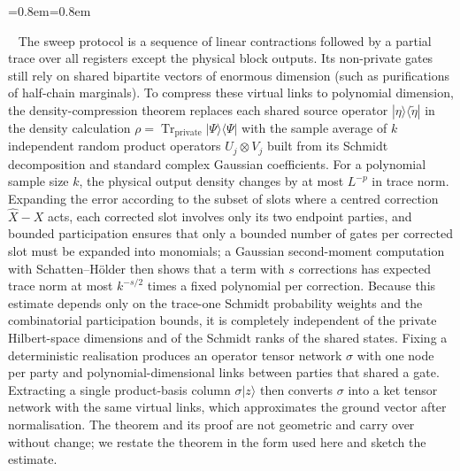 \documentclass[aps,prx,reprint,superscriptaddress,floatfix,nofootinbib,longbibliography,amsmath,amssymb]{revtex4-2}
\newcommand{\Tr}{\operatorname{Tr}}
\providecommand{\ket}[1]{|#1\rangle}\renewcommand{\ket}[1]{|#1\rangle}
\providecommand{\bra}[1]{\langle #1|}\renewcommand{\bra}[1]{\langle #1|}
\theoremstyle{plain}
\theoremstyle{definition}
\newenvironment{inwords}{%
  \par\medskip\noindent
  \begin{list}{}{\leftmargin=0.8em\rightmargin=0.8em}
  \item\relax
  \noindent{\sffamily\bfseries\color{blue!40!black}In words.}\ \sffamily\small}{%
  \end{list}\par\medskip}
\begin{document}
\begin{inwords}
The sweep protocol is a sequence of linear contractions followed by a partial
trace over all registers except the physical block outputs. Its non-private
gates still rely on shared bipartite vectors of enormous dimension (such as
purifications of half-chain marginals). To compress these virtual links to
polynomial dimension, the density-compression theorem replaces each shared
source operator $\ket\eta\bra{\tilde\eta}$ in the density calculation
$\rho=\Tr_{\mathrm{private}}\ket\Psi\bra\Psi$ with the sample average of $k$
independent random product operators $U_j\otimes V_j$ built from its Schmidt
decomposition and standard complex Gaussian coefficients. For a polynomial
sample size $k$, the physical output density changes by at most $L^{-p}$ in
trace norm. Expanding the error according to the subset of slots where a
centred correction $\widehat X-X$ acts, each corrected slot involves only its
two endpoint parties, and bounded participation ensures that only a bounded
number of gates per corrected slot must be expanded into monomials; a
Gaussian second-moment computation with Schatten--Hölder then shows that a
term with $s$ corrections has expected trace norm at most $k^{-s/2}$ times a
fixed polynomial per correction. Because this estimate depends only on the
trace-one Schmidt probability weights and the combinatorial participation
bounds, it is completely independent of the private Hilbert-space dimensions
and of the Schmidt ranks of the shared states. Fixing a deterministic
realisation produces an operator tensor network $\sigma$ with one node per
party and polynomial-dimensional links between parties that shared a gate.
Extracting a single product-basis column $\sigma\ket z$ then converts
$\sigma$ into a ket tensor network with the same virtual links, which
approximates the ground vector after normalisation. The theorem and its
proof are not geometric and carry over without change; we restate the
theorem in the form used here and sketch the estimate.
\end{inwords}
\end{document}
